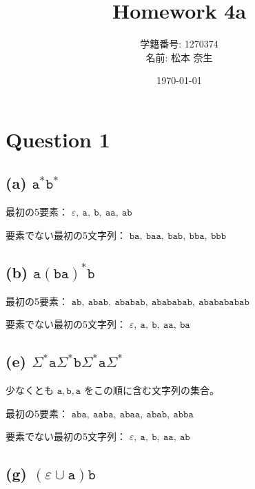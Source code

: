 \documentclass[uplatex,a4paper,11pt]{jsarticle}
\title{Homework 4a}
\author{学籍番号: 1270374 \\ 名前: 松本 奈生}
\date{\today}
\begin{document}
\maketitle

\section*{Question 1}
\subsection*{(a) $\mathtt{a^*b^*}$}

最初の5要素：
$\varepsilon,\ \mathtt{a},\ \mathtt{b},\ \mathtt{aa},\ \mathtt{ab}$

要素でない最初の5文字列：
$\mathtt{ba},\ \mathtt{baa},\ \mathtt{bab},\ \mathtt{bba},\ \mathtt{bbb}$

\subsection*{(b) $\mathtt{a(ba)^*b}$}

最初の5要素：
$\mathtt{ab},\ \mathtt{abab},\ \mathtt{ababab},\ \mathtt{abababab},\ \mathtt{ababababab}$

要素でない最初の5文字列：
$\varepsilon,\ \mathtt{a},\ \mathtt{b},\ \mathtt{aa},\ \mathtt{ba}$

\subsection*{(e) $\Sigma^*\mathtt{a}\Sigma^*\mathtt{b}\Sigma^*\mathtt{a}\Sigma^*$}

少なくとも $\mathtt{a}, \mathtt{b}, \mathtt{a}$ をこの順に含む文字列の集合。

最初の5要素：
$\mathtt{aba},\ \mathtt{aaba},\ \mathtt{abaa},\ \mathtt{abab},\ \mathtt{abba}$

要素でない最初の5文字列：
$\varepsilon,\ \mathtt{a},\ \mathtt{b},\ \mathtt{aa},\ \mathtt{ab}$

\subsection*{(g) $(\varepsilon \cup \mathtt{a})\mathtt{b}$}
\end{document}
